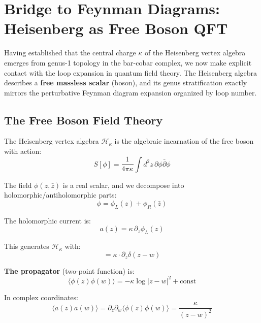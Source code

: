 \section{Bridge to Feynman Diagrams: Heisenberg as Free Boson QFT}

Having established that the central charge $\kappa$ of the Heisenberg vertex algebra emerges from genus-1 topology in the bar-cobar complex, we now make explicit contact with the loop expansion in quantum field theory. The Heisenberg algebra describes a \textbf{free massless scalar} (boson), and its genus stratification exactly mirrors the perturbative Feynman diagram expansion organized by loop number.

\subsection{The Free Boson Field Theory}

The Heisenberg vertex algebra $\mathcal{H}_\kappa$ is the algebraic incarnation of the free boson with action:
\begin{equation}
S[\phi] = \frac{1}{4\pi\kappa} \int d^2z \, \partial\phi \bar{\partial}\phi
\end{equation}

The field $\phi(z, \bar{z})$ is a real scalar, and we decompose into holomorphic/antiholomorphic parts:
\begin{equation}
\phi = \phi_L(z) + \phi_R(\bar{z})
\end{equation}

The holomorphic current is:
\begin{equation}
a(z) = \kappa \, \partial_z \phi_L(z)
\end{equation}

This generates $\mathcal{H}_\kappa$ with:
\begin{equation}
[a(z), a(w)] = \kappa \cdot \partial_z \delta(z - w)
\end{equation}

\textbf{The propagator} (two-point function) is:
\begin{equation}
\langle \phi(z) \phi(w) \rangle = -\kappa \log|z - w|^2 + \text{const}
\end{equation}

In complex coordinates:
\begin{equation}
\langle a(z) a(w) \rangle = \partial_z \partial_w \langle \phi(z) \phi(w) \rangle = \frac{\kappa}{(z-w)^2}
\end{equation}

